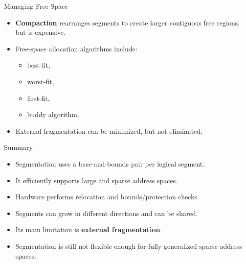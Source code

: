 \begin{frame}{Managing Free Space}
    \begin{itemize}
        \item \textbf{Compaction} rearranges segments to create larger
              contiguous free regions, but is expensive.
        \item Free-space allocation algorithms include:
        \begin{itemize}
            \item best-fit,
            \item worst-fit,
            \item first-fit,
            \item buddy algorithm.
        \end{itemize}
        \item External fragmentation can be minimized, but not eliminated.
    \end{itemize}
\end{frame}


\begin{frame}{Summary}
    \begin{itemize}
        \item Segmentation uses a base-and-bounds pair per logical segment.
        \item It efficiently supports large and sparse address spaces.
        \item Hardware performs relocation and bounds/protection checks.
        \item Segments can grow in different directions and can be shared.
        \item Its main limitation is \textbf{external fragmentation}.
        \item Segmentation is still not flexible enough for fully
              generalized sparse address spaces.
    \end{itemize}
\end{frame}